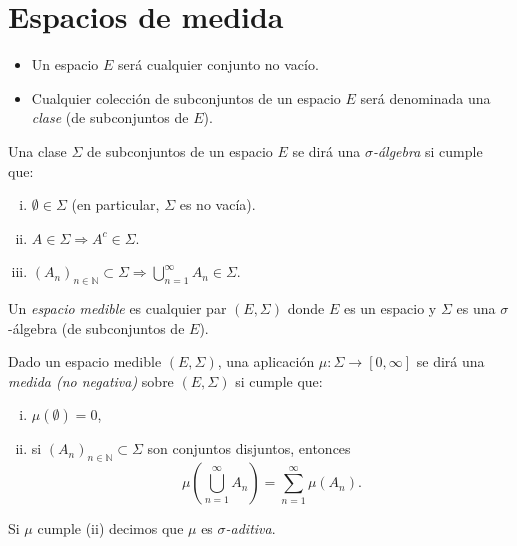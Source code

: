 
\section{Espacios de medida}

\begin{itemize}
    \item Un espacio \(E\) será cualquier conjunto no vacío.

    \item Cualquier colección de subconjuntos de un espacio \(E\) será denominada una \textit{clase} (de subconjuntos de \(E\)).
\end{itemize}

\begin{definition}
    Una clase \(\Sigma\) de subconjuntos de un espacio \(E\) se dirá una \textit{\(\sigma\)-álgebra} si cumple que:
	\begin{enumerate}[i)]
        \item \(\emptyset \in \Sigma\) (en particular, \(\Sigma\) es no vacía).

        \item \(A \in \Sigma \Rightarrow A^c \in \Sigma\).

        \item \((A_n)_{n \in \mathbb{N}} \subset \Sigma \Rightarrow \bigcup_{n=1}^{\infty} A_n \in \Sigma\).
    \end{enumerate}
\end{definition}

\begin{definition}
    Un \textit{espacio medible} es cualquier par \((E, \Sigma)\) donde \(E\) es un espacio y \(\Sigma\) es una \(\sigma\)-álgebra (de subconjuntos de \(E\)).
\end{definition}

\begin{definition}[Medida]
    Dado un espacio medible \((E, \Sigma)\), una aplicación \(\mu : \Sigma \to [0, \infty]\) se dirá una \textit{medida (no negativa)} sobre \((E, \Sigma)\) si cumple que:
	\begin{enumerate}[i)]
        \item \(\mu(\emptyset) = 0\),
		\item si \((A_n)_{n\in\mathbb{N}} \subset \Sigma\) son conjuntos disjuntos, entonces 
		\[ \mu\left( \bigcup_{n=1}^{\infty} A_n \right) = \sum_{n=1}^{\infty} \mu(A_n). \]
    \end{enumerate}
    Si \(\mu\) cumple (ii) decimos que \(\mu\) es \textit{\(\sigma\)-aditiva}.
\end{definition}

